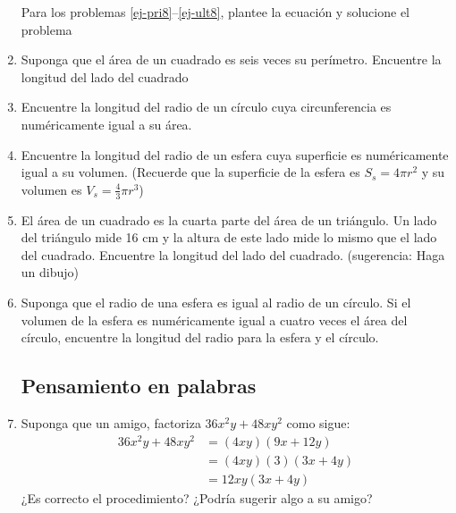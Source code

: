 \documentclass[10pt,twoside]{article}
\begin{document}
\begin{enumerate}
Para los problemas \ref{ej-pri8}--\ref{ej-ult8}, plantee la ecuaci\'{o}n y solucione el problema
\item Suponga que el \'{a}rea de un cuadrado es seis veces su per\'{i}metro. Encuentre la longitud del lado del cuadrado
\item Encuentre la longitud del radio de un círculo cuya circunferencia es numéricamente igual a su área.
\item Encuentre la longitud del radio de un esfera cuya superficie es numéricamente igual a su volumen. (Recuerde que la superficie de la esfera es $S_{s}=4\pi r^{2}$ y su volumen es $V_{s}=\frac{4}{3}\pi r^{3}$)
\item El área de un cuadrado es la cuarta parte del área de un triángulo. Un lado del triángulo mide 16 cm y la altura de este lado mide lo mismo que el lado del cuadrado. Encuentre la longitud del lado del cuadrado. (sugerencia: Haga un dibujo)
\item Suponga que el radio de una esfera es igual al radio de un círculo. Si el volumen de la esfera es numéricamente igual a cuatro veces el área del círculo, encuentre la longitud del radio para la esfera y el círculo.
\subsection*{Pensamiento en palabras}
\item Suponga que un amigo, factoriza $36x^{2}y+48xy^{2}$ como sigue:
\begin{align*}
36x^{2}y+48xy^{2}&=(4xy)(9x+12y)\\
&=(4xy)(3)(3x+4y)\\
&=12xy(3x+4y)
\end{align*}
¿Es correcto el procedimiento? ¿Podr\'{i}a sugerir algo a su amigo?
\end{enumerate}
\end{document}
